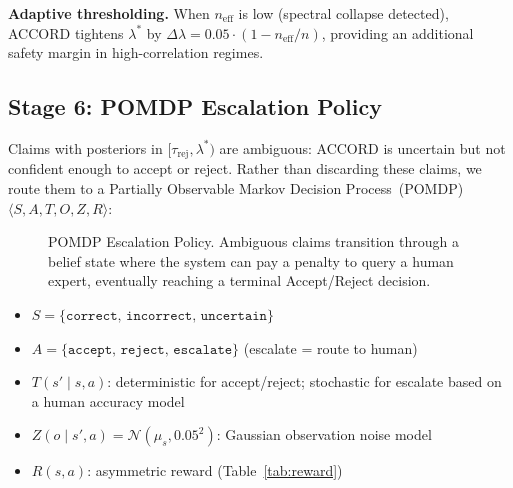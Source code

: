 \documentclass[conference]{IEEEtran}
\begin{document}
\textbf{Adaptive thresholding.}
When $n_\text{eff}$ is low (spectral collapse detected),
ACCORD tightens $\lambda^*$ by $\Delta\lambda = 0.05 \cdot (1 - n_\text{eff}/n)$,
providing an additional safety margin in high-correlation regimes.

\subsection{Stage 6: POMDP Escalation Policy}
\label{sec:pomdp}

Claims with posteriors in $[\tau_\text{rej}, \lambda^*)$
are ambiguous: ACCORD is uncertain but not confident enough
to accept or reject.
Rather than discarding these claims, we route them to a
Partially Observable Markov Decision Process~(POMDP)
$\langle S, A, T, O, Z, R \rangle$:

\begin{figure}[t]
  \centering
  \caption{POMDP Escalation Policy. Ambiguous claims transition through a belief state where the system can pay a penalty to query a human expert, eventually reaching a terminal Accept/Reject decision.}
  \label{fig:pomdp}
\end{figure}

\begin{itemize}
  \item $S = \{\texttt{correct},\, \texttt{incorrect},\,
              \texttt{uncertain}\}$
  \item $A = \{\texttt{accept},\, \texttt{reject},\,
              \texttt{escalate}\}$ (escalate = route to human)
  \item $T(s' \mid s, a)$: deterministic for accept/reject;
        stochastic for escalate based on a human accuracy model
  \item $Z(o \mid s', a) = \mathcal{N}(\mu_s, 0.05^2)$:
        Gaussian observation noise model
  \item $R(s, a)$: asymmetric reward
        (Table~\ref{tab:reward})
\end{itemize}
\end{document}
